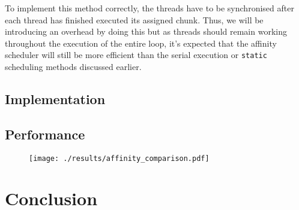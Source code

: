 \documentclass[11pt, a4paper]{article}
\begin{document}
			To implement this method correctly, the threads have to be synchronised after each thread has finished executed its assigned chunk. Thus, we will be introducing an overhead by doing this but as threads should remain working throughout the execution of the entire loop, it's expected that the affinity scheduler will still be more efficient than the serial execution or \texttt{static} scheduling methods discussed earlier.
			
		\subsection{Implementation}
		
		\subsection{Performance}
		
			\begin{figure}
				\centering
				\texttt{[image: ./results/affinity\_comparison.pdf]}
				\caption{}
				\label{fig:affinity_comparison}
			\end{figure}
		
	
	\section{Conclusion}
			
\end{document}
